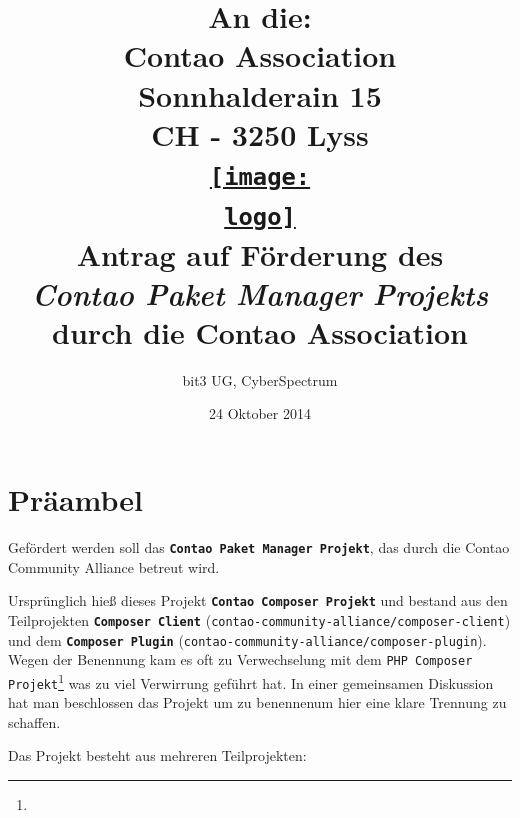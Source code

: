 \documentclass[
paper=a4,
draft=false,%
fontsize=10pt%
]{scrartcl}
\def\logo{logos/colorlogo_rgb}%
\newcommand{\contaoPackageManagerProject}{\textbf{\texttt{Contao Paket Manager Projekt}}}
\newcommand{\composerClient}{\textbf{\texttt{Composer Client}}}
\newcommand{\composerPlugin}{\textbf{\texttt{Composer Plugin}}}
\begin{document}
\title{%
An die:\\
Contao Association\\
Sonnhalderain 15\\
CH - 3250 Lyss\\
\href{http://c-c-a.org}{\texttt{[image: \\logo]}}\\
Antrag auf Förderung des \\
\textit{Contao Paket Manager Projekts} \\
durch die Contao Association\\%
}
\date{24 Oktober 2014}
\author{bit3 UG, CyberSpectrum}
\maketitle

\pagebreak

%
%

\section*{Präambel}
\label{sec:preamble}

Gefördert werden soll das \contaoPackageManagerProject{}, das durch die Contao Community Alliance betreut wird.

\begin{emquotation}
Ursprünglich hieß dieses Projekt \textbf{\texttt{Contao Composer Projekt}} und bestand aus den Teilprojekten \composerClient{} (\texttt{contao-community-alliance/composer-client}) und dem \composerPlugin{} (\texttt{contao-community-alliance/composer-plugin}). Wegen der Benennung kam es oft zu Verwechselung mit dem \texttt{PHP Composer Projekt}\footnote{} was zu viel Verwirrung geführt hat. In einer gemeinsamen Diskussion hat man beschlossen das Projekt um zu benennen\footnotemark um hier eine klare Trennung zu schaffen.
\end{emquotation}


Das Projekt besteht aus mehreren Teilprojekten:
\end{document}
